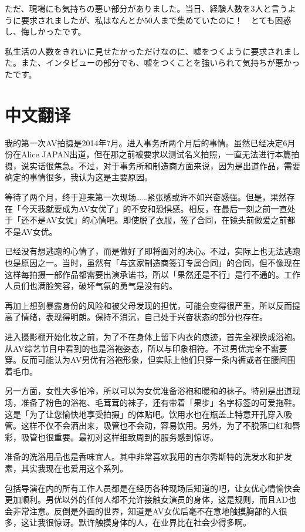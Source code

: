 \documentclass[12pt,UTF8]{ctexbook}
\begin{document}
ただ、現場にも気持ちの悪い部分がありました。当日、経験人数を3人と言うように要求されましたが、私はなんとか50人まで集めていたのに！　とても困惑し、悔しかったです。

私生活の人数をきれいに見せたかっただけなのに、嘘をつくように要求されました。また、インタビューの部分でも、嘘をつくことを強いられて気持ちが悪かったです。

\switchcolumn

\section*{中文翻译}

我的第一次AV拍摄是2014年7月。进入事务所两个月后的事情。虽然已经决定6月份在Alice JAPAN出道，但在那之前被要求以测试名义拍照，一直无法进行本篇拍摄，说实话很焦急。不过，对于事务所和制造商方面来说，因为是出道作品，需要确定的事情很多，我认为这是主要原因。

等待了两个月，终于迎来第一次现场……紧张感或许不如兴奋感强。但是，果然存在「今天我就要成为AV女优了」的不安和恐惧感。相反，在最后一刻之前一直处于「还不是AV女优」的心情吧。即使脱了衣服，签了合同，在镜头前做爱之前都不是AV女优。

已经没有想逃跑的心情了，而是做好了即将面对的决心。不过，实际上也无法逃跑也是原因之一。当时，虽然有「与这家制造商签订专属合同」的合同，但不像现在这样每拍摄一部作品都需要出演承诺书，所以「果然还是不行」是行不通的。工作人员们也满脸笑容，破坏气氛的勇气是没有的。

再加上想到暴露身份的风险和被父母发现的担忧，可能会变得很严重，所以反而提高了情绪，表现得明朗。保持不消沉，自己处于兴奋状态的部分也存在。

进入摄影棚开始化妆之前，为了不在身体上留下内衣的痕迹，首先全裸换成浴袍。从AV综艺节目中看到的也是浴袍姿态，所以与印象相符。不过男优完全不需要穿。反而可能认为AV男优有浴袍形象，但实际上他们只穿一条内裤或者在腰间围着毛巾。

另一方面，女性大多怕冷，所以可以为女优准备浴袍和暖和的袜子。特别是出道现场，准备了粉色的浴袍、毛茸茸的袜子，还有带着「果步」名字标签的可爱拖鞋。这是「为了让您愉快地享受拍摄」的体贴吧。饮用水也在瓶盖上特意开孔穿入吸管。这样不仅不会洒出来，吸管也不会动，容易饮用。另外，为了不脱落口红和唇彩，吸管也很重要。最初对这样细致周到的服务感到惊讶。

准备的洗浴用品也是香味宜人。其中非常喜欢我用的吉尔秀斯特的洗发水和护发素，其实我现在也爱用这个系列。

包括导演在内的所有工作人员都是在经历各种现场后知道的吧，让女优心情愉快会更加顺利。男优以外的任何人都不允许接触女演员的身体，这是规则，而且AD也会非常注意。反倒是外面的世界，知道是AV女优后毫不在意地触摸胸部的人很多，这让我很惊讶。默许触摸身体的人，在业界比在社会少得多啊。
\end{document}
